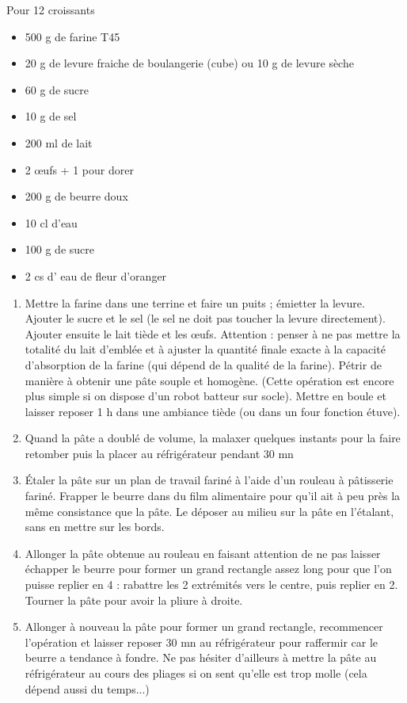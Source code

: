 {Pour 12 croissants}{\begin{itemize}
	\item 500 g de farine T45
	\item 20 g de levure fraiche de boulangerie (cube) ou 10 g de levure sèche
	\item 60 g de sucre
	\item 10 g de sel
	\item 200 ml de lait
	\item 2 œufs + 1 pour dorer
	\item 200 g de beurre doux
	\item 10 cl d'eau
	\item 100 g de sucre
	\item 2 cs d' eau de fleur d'oranger
\end{itemize}}
{\begin{enumerate}
	\item Mettre la farine dans une terrine et faire un puits ; émietter la levure. Ajouter le sucre et le sel (le sel ne doit pas toucher la levure directement). Ajouter ensuite le lait tiède et les \oe ufs. Attention : penser à ne pas mettre la totalité du lait d'emblée et à ajuster la quantité finale exacte à la capacité d'absorption de la farine (qui dépend de la qualité de la farine). Pétrir de manière à obtenir une pâte souple et homogène. (Cette opération est encore plus simple si on dispose d'un robot batteur sur socle). Mettre en boule et laisser reposer 1 h dans une ambiance tiède (ou dans un four fonction étuve).
	\item Quand la pâte a doublé de volume, la malaxer quelques instants pour la faire retomber puis la placer au réfrigérateur pendant 30 mn 
	\item Étaler la pâte sur un plan de travail fariné à l'aide d'un rouleau à pâtisserie fariné. Frapper le beurre dans du film alimentaire pour qu'il ait à peu près la même consistance que la pâte. Le déposer au milieu sur la pâte en l'étalant, sans en mettre sur les bords.
	\item Allonger la pâte obtenue au rouleau en faisant attention de ne pas laisser échapper le beurre pour former un grand rectangle assez long pour que l'on puisse replier en 4 : rabattre les 2 extrémités vers le centre, puis replier en 2. Tourner la pâte pour avoir la pliure à droite.
	\item Allonger à nouveau la pâte pour former un grand rectangle, recommencer l'opération et laisser reposer 30 mn au réfrigérateur pour raffermir car le beurre a tendance à fondre. Ne pas hésiter d'ailleurs à mettre la pâte au réfrigérateur au cours des pliages si on sent qu'elle est trop molle (cela dépend aussi du temps...)

\end{enumerate}}
